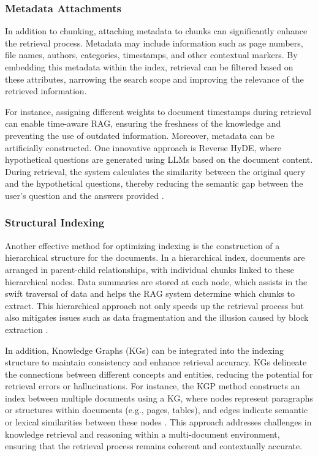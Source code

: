\subsubsection{Metadata Attachments}

In addition to chunking, attaching metadata to chunks can significantly enhance the retrieval process. Metadata may include information such as page numbers, file names, authors, categories, timestamps, and other contextual markers. By embedding this metadata within the index, retrieval can be filtered based on these attributes, narrowing the search scope and improving the relevance of the retrieved information. 

For instance, assigning different weights to document timestamps during retrieval can enable time-aware RAG, ensuring the freshness of the knowledge and preventing the use of outdated information. Moreover, metadata can be artificially constructed. One innovative approach is Reverse HyDE, where hypothetical questions are generated using LLMs based on the document content. During retrieval, the system calculates the similarity between the original query and the hypothetical questions, thereby reducing the semantic gap between the user's question and the answers provided \cite{gao2023retrieval}.

\subsubsection{Structural Indexing}

Another effective method for optimizing indexing is the construction of a hierarchical structure for the documents. In a hierarchical index, documents are arranged in parent-child relationships, with individual chunks linked to these hierarchical nodes. Data summaries are stored at each node, which assists in the swift traversal of data and helps the RAG system determine which chunks to extract. This hierarchical approach not only speeds up the retrieval process but also mitigates issues such as data fragmentation and the illusion caused by block extraction \cite{gao2023retrieval}.

In addition, Knowledge Graphs (KGs) can be integrated into the indexing structure to maintain consistency and enhance retrieval accuracy. KGs delineate the connections between different concepts and entities, reducing the potential for retrieval errors or hallucinations. For instance, the KGP method constructs an index between multiple documents using a KG, where nodes represent paragraphs or structures within documents (e.g., pages, tables), and edges indicate semantic or lexical similarities between these nodes \cite{wang2024knowledge}. This approach addresses challenges in knowledge retrieval and reasoning within a multi-document environment, ensuring that the retrieval process remains coherent and contextually accurate.

